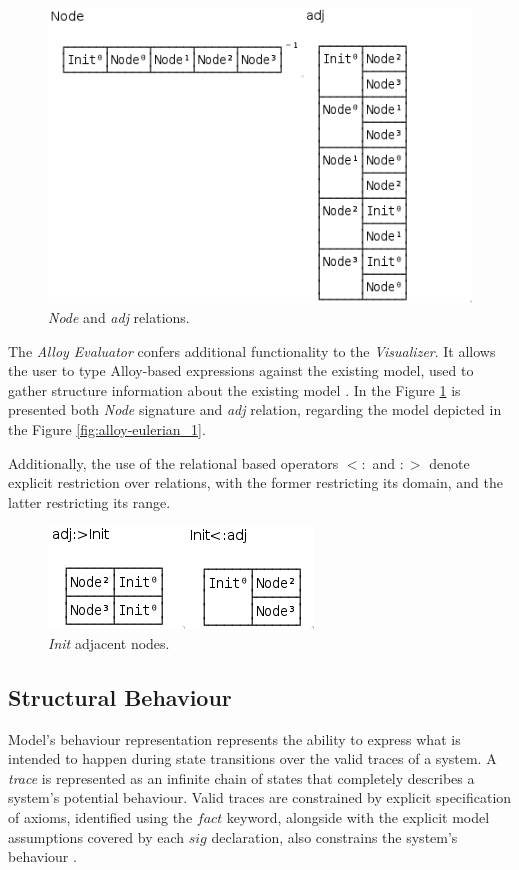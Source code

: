 \begin{figure}[H]
    \centering
    \includegraphics[width=0.4\linewidth]{images/alloy_evaluator1.png}
    \caption{\textit{Node} and \textit{adj} relations.}
    \label{fig:alloy-evaluator_1}
\end{figure}

The \textit{Alloy Evaluator} \cite{alloy-6} confers additional functionality to the \textit{Visualizer}. It allows the user to type Alloy-based expressions against the existing model, used to gather structure information about the existing model \cite{alloy-docs}. In the Figure \ref{fig:alloy-evaluator_1} is presented both \textit{Node} signature and \textit{adj} relation, regarding the model depicted in the Figure \ref{fig:alloy-eulerian_1}.

Additionally, the use of the relational based operators $<:$ and $:>$ denote explicit restriction over relations, with the former restricting its domain, and the latter restricting its range.

\begin{figure}[H]
    \centering
    \includegraphics[width=0.4\linewidth]{images/alloy_evaluator2.png}
    \caption{\textit{Init} adjacent nodes.}
    \label{fig:alloy-evaluator_2}
\end{figure}


\subsection{Structural Behaviour}

Model's behaviour representation represents the ability to express what is intended to happen during state transitions over the valid traces of a system. A \textit{trace} is represented as an infinite chain of states that completely describes a system's potential behaviour. Valid traces are constrained by explicit specification of axioms, identified using the $fact$ keyword, alongside with the explicit model assumptions covered by each $sig$ declaration, also constrains the system's behaviour \cite{gheyi2007formally}.

